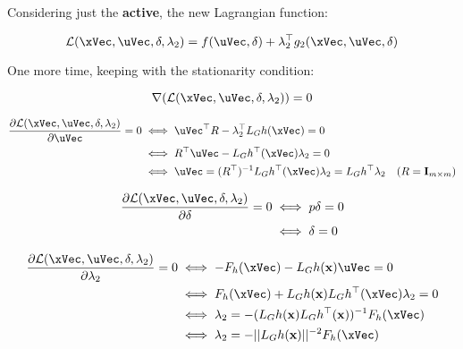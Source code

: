 Considering just the \textbf{ active}, the new Lagrangian function:

\begin{equation}
    \mathcal{L}(\xVec, \uVec, \delta, \lambda_2) = f(\uVec, \delta) + \lambda_2^{\top}g_2(\xVec, \uVec, \delta)
    \label{eq:lagrangian_function_CBFactv}
\end{equation}

One more time, keeping with the stationarity condition:

\begin{equation}
    \nabla(\mathcal{L}(\xVec, \uVec, \delta, \lambda_2)) = 0
    \label{eq:lagrangian_gradient_function_CBFactv}
\end{equation}

\begin{align}
    \frac{\partial \mathcal{L}(\xVec, \uVec, \delta, \lambda_2)}{\partial \uVec} = 0 &\iff \uVec^{\top}R - \lambda_2^{\top}L_Gh(\xVec)  = 0  \notag \\
    &\iff R^{\top}\uVec - L_Gh^{\top}(\xVec) \lambda_2 = 0 \notag \\
    &\iff \uVec = (R^{\top})^{-1}L_Gh^{\top}(\xVec) \lambda_2 = L_Gh^{\top}\lambda_2 \quad ( R = \mathbf{I}_{m \times m} ) \label{eq:lagrangian_input_gradient_function_CBFactv} 
\end{align}


\begin{align}
    \frac{\partial \mathcal{L}(\xVec, \uVec, \delta, \lambda_2)}{\partial \delta} = 0 &\iff p\delta = 0 \notag \\
    &\iff \delta = 0 \label{eq:lagrangian_delta_gradient_function_CBFactv}                                                                                                           
\end{align}

\begin{align}
    \frac{\partial \mathcal{L}(\xVec, \uVec, \delta, \lambda_2)}{\partial \lambda_2} = 0 &\iff  -F_h(\xVec) - L_Gh(\mathbf{x})\uVec = 0  \notag \\
    &\iff    F_h(\xVec) + L_Gh(\mathbf{x})L_Gh^{\top}(\xVec)\lambda_2 = 0    \notag \\                                                                                            
    &\iff    \lambda_2 = - (L_Gh(\mathbf{x})L_Gh^{\top}(\mathbf{x}))^{-1}F_h(\xVec) \notag \\ 
    &\iff    \lambda_2 = - ||L_Gh(\mathbf{x})||^{-2} F_h(\xVec) \label{eq:lagrangian_lambda_gradient_function_CBFactv}   
\end{align}


